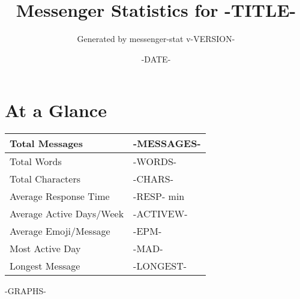 \documentclass[11pt]{article}
\title{Messenger Statistics for -TITLE-}
\author{Generated by messenger-stat v-VERSION-}
\date{-DATE-}
\begin{document}
\maketitle

\section*{At a Glance}
\begin{center}
    \begin{tabularx}{\textwidth}{ | X | p{6cm} | }
    \hline
        Total Messages & -MESSAGES- \\ \hline
        Total Words & -WORDS- \\ \hline
        Total Characters & -CHARS- \\ \hline
        Average Response Time & -RESP- min \\ \hline
        Average Active Days/Week & -ACTIVEW- \\ \hline
        Average Emoji/Message & -EPM- \\ \hline
        Most Active Day & -MAD- \\ \hline
        Longest Message & -LONGEST- \\
    \hline
    \end{tabularx}
\end{center}

\clearpage
-GRAPHS-
\end{document}

